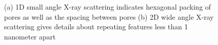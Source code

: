 \documentclass{article}
\newcommand{\angstrom}{\textup{\AA}}
\begin{document}
\begin{figure}
\begin{subfigure}[t]{0.47\linewidth}
{                }
                \caption{}\label{fig:WAXS}
        \end{subfigure}
        \caption{(a) 1D small angle X-ray scattering indicates hexagonal packing of
	pores as well as the spacing between pores (b) 2D wide angle X-ray scattering 
	gives details about repeating features less than 1 nanometer apart}\label{fig:SWAXS}
  \end{figure}

\end{document}
